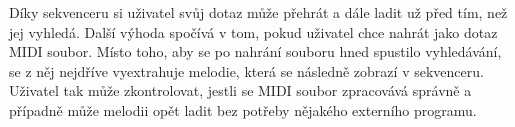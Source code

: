 Díky sekvenceru si uživatel svůj dotaz může přehrát a dále ladit už před tím, než jej vyhledá. Další výhoda spočívá v tom, pokud uživatel chce nahrát jako dotaz MIDI soubor. Místo toho, aby se po nahrání souboru hned spustilo vyhledávání, se z něj nejdříve vyextrahuje melodie, která se následně zobrazí v sekvenceru. Uživatel tak může zkontrolovat, jestli se MIDI soubor zpracovává správně a případně může melodii opět ladit bez potřeby nějakého externího programu.
